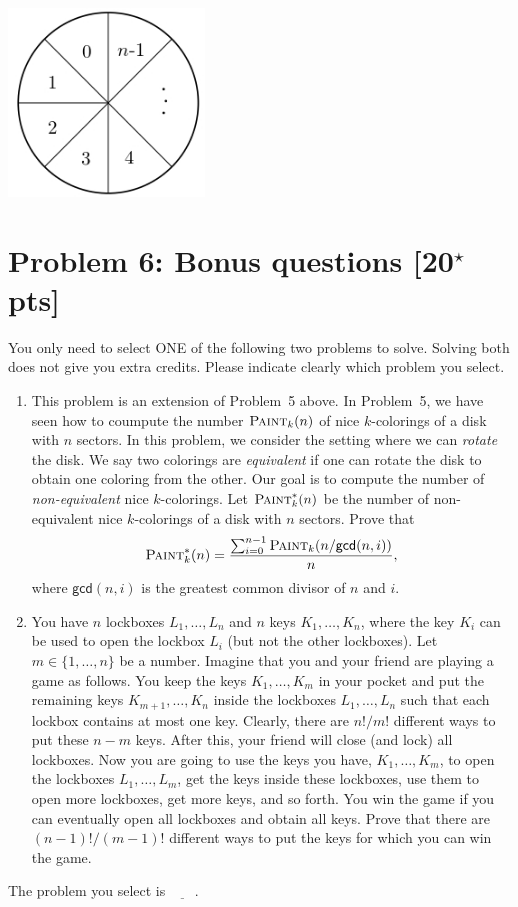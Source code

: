 \documentclass[11pt,twoside]{article}
\newcommand{\problem}[1]{\section*{Problem #1}}
\begin{document}
\begin{center}
    \includegraphics[height=5cm]{hw-fig-sector.jpg}
\end{center}

\problem{6: Bonus questions [20$^\star$ pts]}

{\color{red} You only need to select ONE of the following two problems to solve.
Solving both does not give you extra credits.
Please indicate clearly which problem you select.}

\begin{enumerate}
    \item This problem is an extension of Problem~5 above.
    In Problem~5, we have seen how to coumpute the number $\textsc{Paint}_k(n)$ of nice $k$-colorings of a disk with $n$ sectors.
    In this problem, we consider the setting where we can \textit{rotate} the disk.
    We say two colorings are \textit{equivalent} if one can rotate the disk to obtain one coloring from the other.
    Our goal is to compute the number of \textit{non-equivalent} nice $k$-colorings.
    Let $\textsc{Paint}_k^*(n)$ be the number of non-equivalent nice $k$-colorings of a disk with $n$ sectors.
    Prove that
    \begin{equation*}
        \textsc{Paint}_k^*(n) = \frac{\sum_{i=0}^{n-1} \textsc{Paint}_k(n/\mathsf{gcd}(n,i))}{n},
    \end{equation*}
    where $\mathsf{gcd}(n,i)$ is the greatest common divisor of $n$ and $i$.
    
    \item You have $n$ lockboxes $L_1,\dots,L_n$ and $n$ keys $K_1,\dots,K_n$, where the key $K_i$ can be used to open the lockbox $L_i$ (but not the other lockboxes).
    Let $m \in \{1,\dots,n\}$ be a number.
    Imagine that you and your friend are playing a game as follows.
    You keep the keys $K_1,\dots,K_m$ in your pocket and put the remaining keys $K_{m+1},\dots,K_n$ inside the lockboxes $L_1,\dots,L_n$ such that each lockbox contains at most one key.
    Clearly, there are $n!/m!$ different ways to put these $n-m$ keys.
    After this, your friend will close (and lock) all lockboxes.
    Now you are going to use the keys you have, $K_1,\dots,K_m$, to open the lockboxes $L_1,\dots,L_m$, get the keys inside these lockboxes, use them to open more lockboxes, get more keys, and so forth.
    You win the game if you can eventually open all lockboxes and obtain all keys.
    Prove that there are $(n-1)!/(m-1)!$ different ways to put the keys for which you can win the game.
\end{enumerate}

The problem you select is $\underline{\ \ \ \ \ \ \ \ }$.
\end{document}
